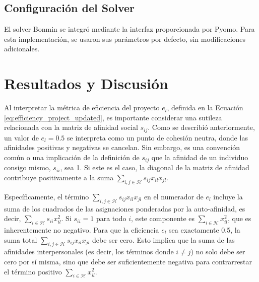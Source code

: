 \documentclass[conference]{IEEEtran}
\begin{document}
\subsection{Configuración del Solver}

El solver Bonmin se integró mediante la interfaz proporcionada por Pyomo. Para esta implementación, se usaron sus parámetros por defecto, sin modificaciones adicionales.

\section{Resultados y Discusión}

Al interpretar la métrica de eficiencia del proyecto $e_l$, definida en la Ecuación \ref{eq:efficiency_project_updated}, es importante considerar una sutileza relacionada con la matriz de afinidad social $s_{ij}$. Como se describió anteriormente, un valor de $e_l=0.5$ se interpreta como un punto de cohesión neutra, donde las afinidades positivas y negativas se cancelan. Sin embargo, es una convención común o una implicación de la definición de $s_{ij}$ que la afinidad de un individuo consigo mismo, $s_{ii}$, sea 1. Si este es el caso, la diagonal de la matriz de afinidad contribuye positivamente a la suma $\sum_{i,j \in \mathcal{H}} s_{ij} x_{il} x_{jl}$.

Específicamente, el término $\sum_{i,j \in \mathcal{H}} s_{ij} x_{il} x_{jl}$ en el numerador de $e_l$ incluye la suma de los cuadrados de las asignaciones ponderadas por la auto-afinidad, es decir, $\sum_{i \in \mathcal{H}} s_{ii} x_{il}^2$. Si $s_{ii}=1$ para todo $i$, este componente es $\sum_{i \in \mathcal{H}} x_{il}^2$, que es inherentemente no negativo. Para que la eficiencia $e_l$ sea exactamente 0.5, la suma total $\sum_{i,j \in \mathcal{H}} s_{ij} x_{il} x_{jl}$ debe ser cero. Esto implica que la suma de las afinidades interpersonales (es decir, los términos donde $i \neq j$) no solo debe ser cero por sí misma, sino que debe ser suficientemente negativa para contrarrestar el término positivo $\sum_{i \in \mathcal{H}} x_{il}^2$.
\end{document}
